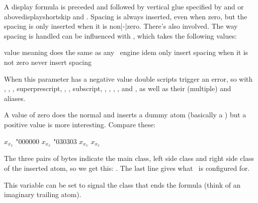 A display formula is preceded and followed by vertical glue specified by
 and  or \prm
{abovedisplayshortskip} and . Spacing 
is always inserted, even when zero, but the spacing  is only
inserted when it is non|-|zero. There's also  involved. The
way spacing is handled can be influenced with , which
takes the following values:


\starttabulate[|c|l|]
\FL
\BC value \BC meaning                                 \NC \NR
\TL
{}     \NC does the same as any \TEX\ engine       \NC \NR
{}     \NC idem                                    \NC \NR
{}     \NC only insert spacing when it is not zero \NC \NR
{}     \NC never insert spacing                    \NC \NR
\LL
\stoptabulate

\stopnewprimitive

\startnewprimitive[title={\prm {mathdoublescriptmode}}]

When this parameter has a negative value double scripts trigger an error, so with
, , , \prm
{superprescript}, , , \prm
{subscript}, , , ,
,  and , as well
as their (multiple) \type {_} and \type {^} aliases.

A value of zero does the normal and inserts a dummy atom (basically a \type {{}})
but a positive value is more interesting. Compare these:

\startbuffer
{      $x_x_x$}
{\mathdoublescriptmode"000000 $x_x_x$}
{\mathdoublescriptmode"030303 $x_x_x$}
{$x_x_x$}
\stopbuffer

\typebuffer

The three pairs of bytes indicate the main class, left side class and right side
class of the inserted atom, so we get this: \inlinebuffer. The last line gives
what \CONTEXT\ is configured for.

\stopnewprimitive

\startnewprimitive[title={\prm {mathendclass}}]

This variable can be set to signal the class that ends the formula (think of an
imaginary trailing atom).

\stopnewprimitive

